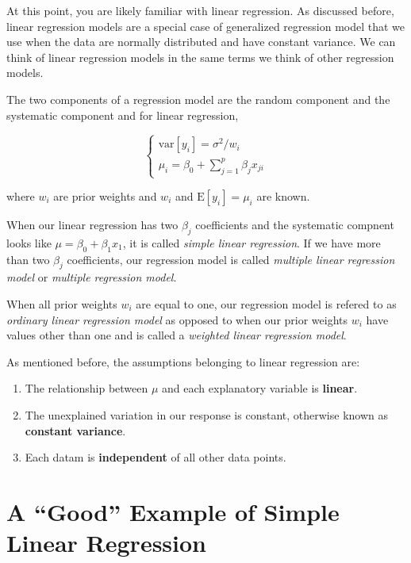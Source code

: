 \documentclass[
]{book}
\providecommand{\tightlist}{%
  \setlength{\itemsep}{0pt}\setlength{\parskip}{0pt}}
\begin{document}
At this point, you are likely familiar with linear regression. As discussed before, linear regression models are a special case of generalized regression model that we use when the data are normally distributed and have constant variance. We can think of linear regression models in the same terms we think of other regression models.

The two components of a regression model are the random component and the systematic component and for linear regression,

\[
\begin{cases}
  \text{var}[y_i] = \sigma^2/w_i \\
  \mu_i = \beta_0 + \sum_{j=1}^{p}\beta_jx_{ji}
\end{cases}
\]

where \(w_i\) are prior weights and \(w_i\) and \(\text{E}[y_i] = \mu_i\) are known.

When our linear regression has two \(\beta_j\) coefficients and the systematic compnent looks like \(\mu = \beta_0 + \beta_1x_1\), it is called \emph{simple linear regression}. If we have more than two \(\beta_j\) coefficients, our regression model is called \emph{multiple linear regression model} or \emph{multiple regression model}.

When all prior weights \(w_i\) are equal to one, our regression model is refered to as \emph{ordinary linear regression model} as opposed to when our prior weights \(w_i\) have values other than one and is called a \emph{weighted linear regression model}.

As mentioned before, the assumptions belonging to linear regression are:

\begin{enumerate}
\def\labelenumi{\arabic{enumi}.}
\tightlist
\item
  The relationship between \(\mu\) and each explanatory variable is \textbf{linear}.
\item
  The unexplained variation in our response is constant, otherwise known as \textbf{constant variance}.
\item
  Each datam is \textbf{independent} of all other data points.
\end{enumerate}

\hypertarget{a-good-example-of-simple-linear-regression}{%
\section{A ``Good'' Example of Simple Linear Regression}\label{a-good-example-of-simple-linear-regression}}
\end{document}

